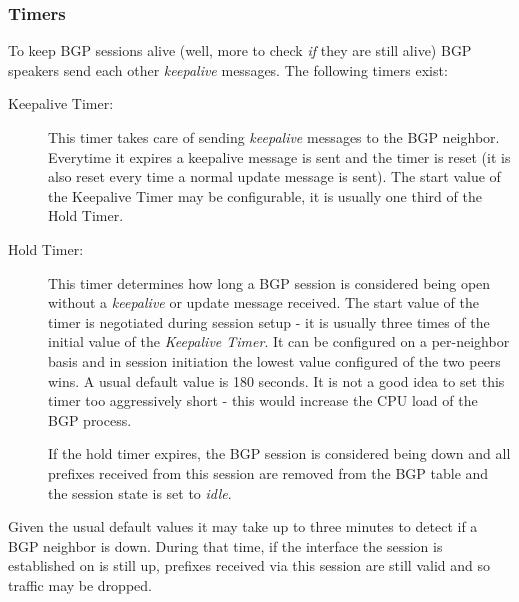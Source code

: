\subsubsection{Timers}
To keep BGP sessions alive (well, more to check \emph{if} they are still alive) BGP speakers send each other \emph{keepalive} messages. The following timers  exist:
\begin{description}
  \item[Keepalive Timer:] This timer takes care of sending \emph{keepalive} messages to the BGP neighbor. Everytime it expires a keepalive message is sent and the timer is reset (it is also reset every time a normal update message is sent). The start value of the Keepalive Timer may be configurable, it is usually one third of the Hold Timer.
  \item[Hold Timer:] This timer determines how long a BGP session is considered being open without a \emph{keepalive} or update message received. The start value of the timer is negotiated during session setup - it is usually three times of the initial value of the \emph{Keepalive Timer}. It can be configured on a per-neighbor basis and in session initiation the lowest value configured of the two peers wins. A usual default value is 180 seconds. It is not a good idea to set this timer too aggressively short - this would increase the CPU load of the BGP process.

  If the hold timer expires, the BGP session is considered being down and all prefixes received from this session are removed from the BGP table and the session state is set to \emph{idle}.
\end{description}

Given the usual default values it may take up to three minutes to detect if a BGP neighbor is down. During that time, if the interface the session is established on is still up, prefixes received via this session are still valid and so traffic may be dropped.





